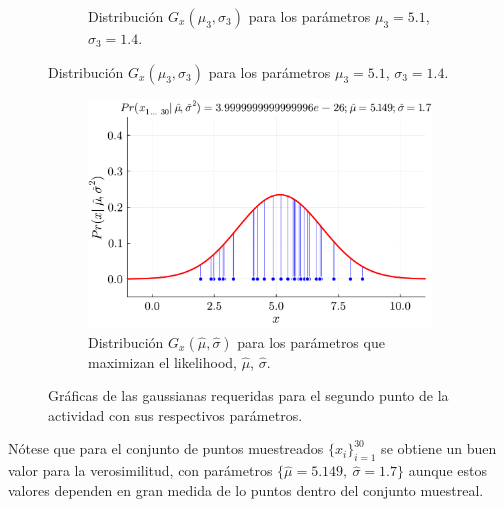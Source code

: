 \begin{enumerate}
\begin{solution}
\begin{figure}[H]
\begin{subfigure}{\textwidth}
                \caption{Distribución $G_{x}(\mu_3, \sigma_3)$ para los parámetros $\mu_3 = 5.1$, $\sigma_3 = 1.4$.}
                \label{fig:gaussiana_3}
            \end{subfigure}
        \end{figure}
        \begin{figure}[H]
            \ContinuedFloat
            \begin{subfigure}{\textwidth}
                \centering
                \includegraphics[scale=0.4]{../figures/dist_max.pdf}
                \caption{Distribución $G_{x}(\hat{\mu}, \hat{\sigma})$ para los parámetros que maximizan el likelihood, $\hat{\mu}$, $\hat{\sigma}$.}
                \label{fig:gaussiana_max}
            \end{subfigure}
            \caption{Gráficas de las gaussianas requeridas para el segundo punto de la actividad con sus respectivos parámetros.}
            \label{fig:gaussianas}
        \end{figure}

        Nótese que para el conjunto de puntos muestreados $\{x_i\}_{i=1}^{30}$ se obtiene un buen valor para la verosimilitud, con parámetros $\{\hat{\mu} = 5.149,\ \hat{\sigma} = 1.7\}$ aunque estos valores dependen en gran medida de lo puntos dentro del conjunto muestreal.


\end{solution}
\end{enumerate}
